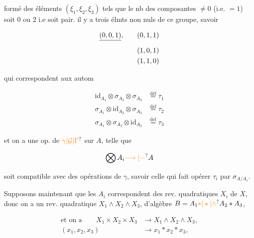 formé des éléments $(\xi_1,\xi_2,\xi_3)$ tels que le nb des composantes $\ne0$ (i.e. $=1$) soit $0$ ou $2$ i.e soit pair.  il y  a trois élmts non nuls de ce groupe, savoir

\[
 \begin{aligned}
 \deleted{(0,0,1)},\qquad &(0,1,1)\\
 &(1,0,1)\\
 &(1,1,0)
 \end{aligned}
\]

qui correspondent aux autom

\[
 \begin{aligned}
 \mathrm{id}_{A_1}\otimes\sigma_{A_2}\otimes\sigma_{A_3}&\overset{\text{déf}}{=}\tau_1\\
 \sigma_{A_1}\otimes\mathrm{id}_{A_2}\otimes\sigma_{A_3}&\overset{\text{def}}{=}\tau_2\\
 \sigma_{A_1}\otimes\sigma_{A_2}\otimes\mathrm{id}_{A_3}&\overset{\text{def}}{=}\tau_3
 \end{aligned}
\]


et  on a une  op. de $\unsure{\gamma|\mathcal G|\Gamma}$ sur $A$, telle que

\[
 \bigotimes A_i\unsure{\longrightarrow|\mathord{-}}A
\]

soit compatible avec des opérations de $\gamma$, savoir celle qui fait opérer \uline{$\tau_i$} par $\sigma_{A/A_i}$.

 Supposons maintenant que les $A_i$ correspondent  des rev. quadratiques $X_i$ de $X$, donc on a un rev. quadratique $X_1\wedge X_2\wedge X_3$, d'algèbre $B=A_1\unsure{*|\star|\wedge}A_2*A_3$,

\[
 \begin{aligned}
 \text{et on a}\qquad X_1\times X_2\times X_3&\longrightarrow X_1\wedge X_2\wedge X_3,\\
 (x_1,x_2,x_3)&\longrightarrow x_1*x_2*x_3,
 \end{aligned}
\]

